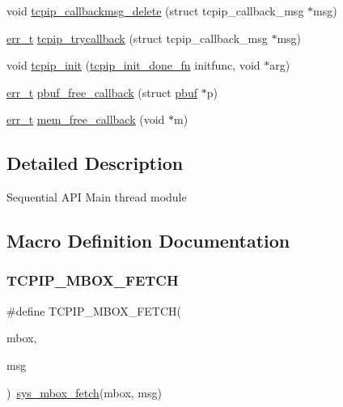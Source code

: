 \begin{DoxyCompactItemize}
\item 
void \hyperlink{openmote-cc2538_2lwip_2src_2api_2tcpip_8c_ac5b7a59f4c3f5f721ab9ee81f231c9fd}{tcpip\+\_\+callbackmsg\+\_\+delete} (struct tcpip\+\_\+callback\+\_\+msg $\ast$msg)
\item 
\hyperlink{group__infrastructure__errors_gaf02d9da80fd66b4f986d2c53d7231ddb}{err\+\_\+t} \hyperlink{openmote-cc2538_2lwip_2src_2api_2tcpip_8c_acfc81ad493f68714a22b3b8ea7d04378}{tcpip\+\_\+trycallback} (struct tcpip\+\_\+callback\+\_\+msg $\ast$msg)
\item 
void \hyperlink{group__lwip__os_ga1f3a88b8df6ba3b9ed1c00e0a305e3db}{tcpip\+\_\+init} (\hyperlink{openmote-cc2538_2lwip_2src_2include_2lwip_2tcpip_8h_a5fe07216c441e27c3028bcac60fa0992}{tcpip\+\_\+init\+\_\+done\+\_\+fn} initfunc, void $\ast$arg)
\item 
\hyperlink{group__infrastructure__errors_gaf02d9da80fd66b4f986d2c53d7231ddb}{err\+\_\+t} \hyperlink{openmote-cc2538_2lwip_2src_2api_2tcpip_8c_a5cdcb6b784fe0e8736a5b31a5cfbed6c}{pbuf\+\_\+free\+\_\+callback} (struct \hyperlink{structpbuf}{pbuf} $\ast$p)
\item 
\hyperlink{group__infrastructure__errors_gaf02d9da80fd66b4f986d2c53d7231ddb}{err\+\_\+t} \hyperlink{openmote-cc2538_2lwip_2src_2api_2tcpip_8c_a55b4de3765c6a37b3f2b26a11603771c}{mem\+\_\+free\+\_\+callback} (void $\ast$m)
\end{DoxyCompactItemize}


\subsection{Detailed Description}
Sequential A\+PI Main thread module 

\subsection{Macro Definition Documentation}
\mbox{\label{openmote-cc2538_2lwip_2src_2api_2tcpip_8c_a509daeff3c37e5659d0decb841b4e262}} 
\subsubsection{\texorpdfstring{T\+C\+P\+I\+P\+\_\+\+M\+B\+O\+X\+\_\+\+F\+E\+T\+CH}{TCPIP\_MBOX\_FETCH}}
{\footnotesize\ttfamily \#define T\+C\+P\+I\+P\+\_\+\+M\+B\+O\+X\+\_\+\+F\+E\+T\+CH(\begin{DoxyParamCaption}\item[{}]{mbox,  }\item[{}]{msg }\end{DoxyParamCaption})~\hyperlink{openmote-cc2538_2lwip_2src_2include_2lwip_2sys_8h_a5bae9efa9c945dc810665dc4a7e60117}{sys\+\_\+mbox\+\_\+fetch}(mbox, msg)}

